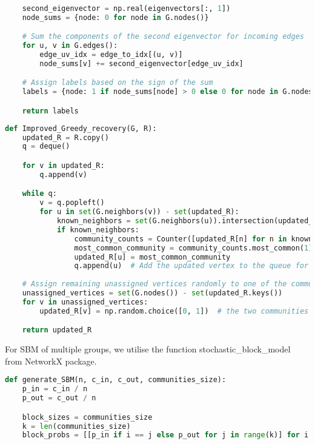 \begin{appendices}
\begin{lstlisting}[language=Python, caption=Implementation of the Spectral Algorithm based on Non-Backtracking Matrix, label=code: spec_algo, numbers=none]
  
    second_eigenvector = np.real(eigenvectors[:, 1])
    node_sums = {node: 0 for node in G.nodes()}

    # Sum the components of the second eigenvector for incoming edges
    for u, v in G.edges():
        edge_uv_idx = edge_to_idx[(u, v)]
        node_sums[v] += second_eigenvector[edge_uv_idx]

    # Assign labels based on the sign of the sum
    labels = {node: 1 if node_sums[node] > 0 else 0 for node in G.nodes()}

    return labels
\end{lstlisting}
\vspace{10mm}
\begin{lstlisting}[language=Python, caption=Implementation of Heuristic Greedy Recovery Algorithm , label=code: heur_greedy, numbers=none]
def Improved_Greedy_recovery(G, R):
    updated_R = R.copy()
    q = deque()

    for v in updated_R:
        q.append(v)

    while q:
        v = q.popleft()
        for u in set(G.neighbors(v)) - set(updated_R):
            known_neighbors = set(G.neighbors(u)).intersection(updated_R)
            if known_neighbors:
                community_counts = Counter([updated_R[n] for n in known_neighbors])
                most_common_community = community_counts.most_common(1)[0][0]
                updated_R[u] = most_common_community
                q.append(u)  # Add the updated vertex to the queue for further propagation
                
    # Assign remaining unassigned vertices randomly to one of the communities
    unassigned_vertices = set(G.nodes()) - set(updated_R.keys())
    for v in unassigned_vertices:
        updated_R[v] = np.random.choice([0, 1])  # the two communities labeled 0 and 1

    return updated_R
\end{lstlisting}
\vspace{10mm}
For SBM of multiple groups, we utilise the function stochastic\_block\_model from NetworkX package.
\begin{lstlisting}[language=Python, caption=Implementation of SBM for multiple groups, label=code: SBM_multi, numbers=none]
def generate_SBM(n, c_in, c_out, communities_size):
    p_in = c_in / n
    p_out = c_out / n

    block_sizes = communities_size
    k = len(communities_size)
    block_probs = [[p_in if i == j else p_out for j in range(k)] for i in range(k)]
 

\end{lstlisting}
\end{appendices}
